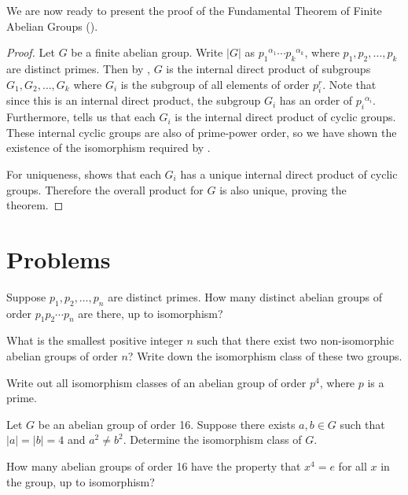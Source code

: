 We are now ready to present the proof of the Fundamental Theorem of Finite Abelian Groups ().
\begin{proof}
    Let $G$ be a finite abelian group. Write $|G|$ as ${p_1}^{\alpha_1}\cdots{p_k}^{\alpha_k}$, where $p_1, p_2, \dots, p_k$ are distinct primes. Then by , $G$ is the internal direct product of subgroups $G_1, G_2, \dots, G_k$ where $G_i$ is the subgroup of all elements of order $p_i^r$. Note that since this is an internal direct product, the subgroup $G_i$ has an order of ${p_i}^{\alpha_i}$. Furthermore,  tells us that each $G_i$ is the internal direct product of cyclic groups. These internal cyclic groups are also of prime-power order, so we have shown the existence of the isomorphism required by .

    For uniqueness,  shows that each $G_i$ has a unique internal direct product of cyclic groups. Therefore the overall product for $G$ is also unique, proving the theorem.
\end{proof}

\newpage

\section{Problems}
\begin{problem}
    Suppose $p_1, p_2, \dots, p_n$ are distinct primes. How many distinct abelian groups of order $p_1p_2\cdots p_n$ are there, up to isomorphism?
\end{problem}

\begin{problem}
    What is the smallest positive integer $n$ such that there exist two non-isomorphic abelian groups of order $n$? Write down the isomorphism class of these two groups.
\end{problem}

\begin{problem}
    Write out all isomorphism classes of an abelian group of order $p^4$, where $p$ is a prime.
\end{problem}

\begin{problem}
    Let $G$ be an abelian group of order 16. Suppose there exists $a, b \in G$ such that $|a| = |b| = 4$ and $a^2 \neq b^2$. Determine the isomorphism class of $G$.
\end{problem}

\begin{problem}
    How many abelian groups of order 16 have the property that $x^4 = e$ for all $x$ in the group, up to isomorphism?
\end{problem}
